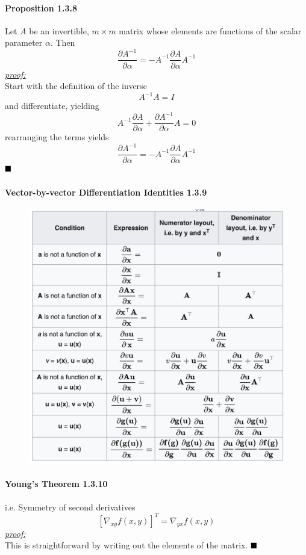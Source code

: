 \documentclass[11pt]{article}
\newcommand{\proof}[0]{\textit{\underline{proof:} }}
\newcommand{\qed}[0]{$\hfill\blacksquare$}
\begin{document}
\paragraph{Proposition 1.3.8}
Let $A$ be an invertible, $m \times m$ matrix whose elements are functions of the scalar parameter $\alpha$. Then
$$\frac{\partial A^{-1}}{\partial \alpha} = -A^{-1}\frac{\partial A}{\partial \alpha} A^{-1}$$
\proof \\
Start with the definition of the inverse
$$A^{-1}A = I$$
and differentiate, yielding
$$A^{-1}\frac{\partial A}{\partial \alpha} + \frac{\partial A^{-1}}{\partial \alpha}A = 0$$
rearranging the terms yields
$$\frac{\partial A^{-1}}{\partial \alpha}  = -A^{-1}\frac{\partial A}{\partial \alpha}A^{-1}$$\qed

\paragraph{Vector-by-vector Differentiation Identities 1.3.9}
 \begin{figure}[h]
	\centering
	\includegraphics[scale=0.6]{p1.png}
\end{figure}

\paragraph{Young's Theorem 1.3.10}
i.e. Symmetry of second derivatives
$$[\nabla_{xy}f(x,y)]^T = \nabla_{yx}f(x,y)$$
\proof \\
This is straightforward by writing out the elements of the matrix. \qed
\end{document}
